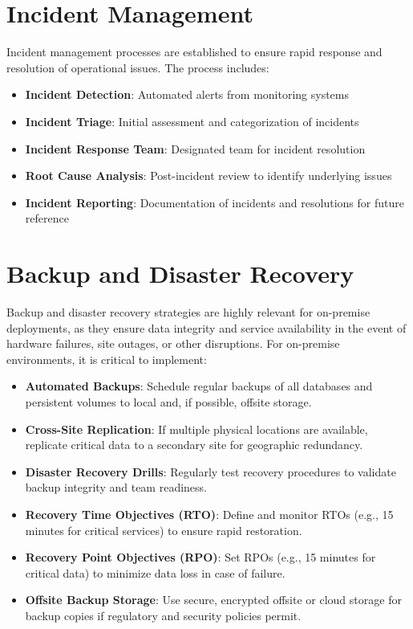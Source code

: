 \documentclass[12pt]{report}
\begin{document}
\section{Incident Management}
Incident management processes are established to ensure rapid response and resolution of operational issues. The process includes:
\begin{itemize}
  \item \textbf{Incident Detection}: Automated alerts from monitoring systems
  \item \textbf{Incident Triage}: Initial assessment and categorization of incidents
  \item \textbf{Incident Response Team}: Designated team for incident resolution
  \item \textbf{Root Cause Analysis}: Post-incident review to identify underlying issues
  \item \textbf{Incident Reporting}: Documentation of incidents and resolutions for future reference
\end{itemize}   
\section{Backup and Disaster Recovery}
Backup and disaster recovery strategies are highly relevant for on-premise deployments, as they ensure data integrity and service availability in the event of hardware failures, site outages, or other disruptions. For on-premise environments, it is critical to implement:

\begin{itemize}
    \item \textbf{Automated Backups}: Schedule regular backups of all databases and persistent volumes to local and, if possible, offsite storage.
    \item \textbf{Cross-Site Replication}: If multiple physical locations are available, replicate critical data to a secondary site for geographic redundancy.
    \item \textbf{Disaster Recovery Drills}: Regularly test recovery procedures to validate backup integrity and team readiness.
    \item \textbf{Recovery Time Objectives (RTO)}: Define and monitor RTOs (e.g., 15 minutes for critical services) to ensure rapid restoration.
    \item \textbf{Recovery Point Objectives (RPO)}: Set RPOs (e.g., 15 minutes for critical data) to minimize data loss in case of failure.
    \item \textbf{Offsite Backup Storage}: Use secure, encrypted offsite or cloud storage for backup copies if regulatory and security policies permit.
\end{itemize}
\end{document}
